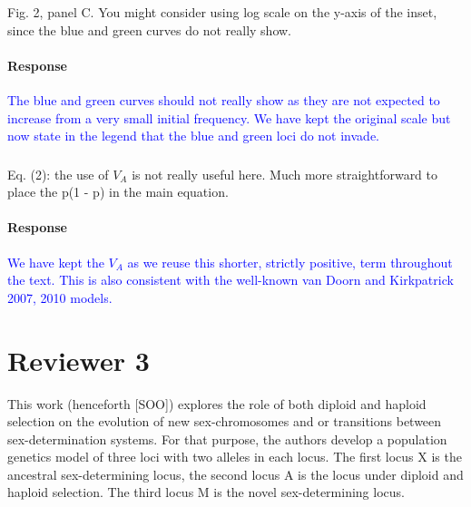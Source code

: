 \documentclass[10pt,letterpaper]{article}
\begin{document}
\noindent\subsubsection{}
Fig. 2, panel C. You might consider using log scale on the y-axis of the inset, since the blue and green curves do not really show.

\noindent\paragraph{Response}
\textcolor{blue}{The blue and green curves should not really show as they are not expected to increase from a very small initial frequency. We have kept the original scale but now state in the legend that the blue and green loci do not invade.}

\noindent\subsubsection{}
Eq. (2): the use of $V_A$ is not really useful here. Much more straightforward to place the p(1 - p) in the main equation.

\noindent\paragraph{Response}
\textcolor{blue}{We have kept the $V_A$ as we reuse this shorter, strictly positive, term throughout the text. This is also consistent with the well-known van Doorn and Kirkpatrick 2007, 2010 models.}

\section{Reviewer 3}

This work (henceforth [SOO]) explores the role of both diploid and haploid selection on the evolution of new sex-chromosomes and or transitions between sex-determination systems. For that purpose, the authors develop a population genetics model of three loci with two alleles in each locus. The first locus X is the ancestral sex-determining locus, the second locus A is the locus under diploid and haploid selection. The third locus M is the novel sex-determining locus.
\end{document}
